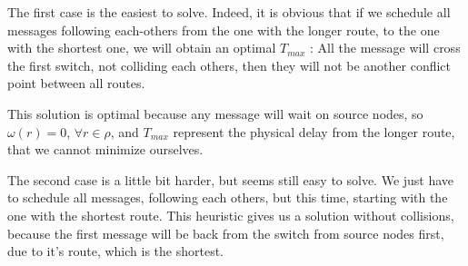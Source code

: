 \documentclass{article}
\begin{document}
The first case is the easiest to solve. Indeed, it is obvious that if we schedule all messages following each-others from the one with the longer route,
to the one with the shortest one, we will obtain an optimal $T_{max}$ : All the message will cross the first switch, not colliding each others, then 
they will not be another conflict point between all routes.

This solution is optimal because any message will wait on source nodes, so $\omega(r) = 0$, $\forall r \in \rho$, and $T_{max}$ represent the physical 
delay from the longer route, that we cannot minimize ourselves. 

The second case is a little bit harder, but seems still easy to solve. We just have to schedule all messages, following each others, but this time,
starting with the one with the shortest route. This heuristic gives us a solution without collisions, because the first message will be back from the
switch from source nodes first, due to it's route, which is the shortest.
\end{document}
